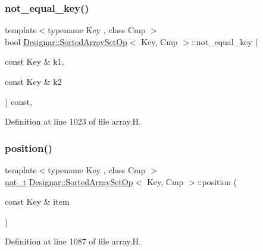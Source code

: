 \subsubsection{\texorpdfstring{not\+\_\+equal\+\_\+key()}{not\_equal\_key()}}
{\footnotesize\ttfamily template$<$typename Key , class Cmp $>$ \\
bool \hyperlink{class_designar_1_1_sorted_array_set_op}{Designar\+::\+Sorted\+Array\+Set\+Op}$<$ Key, Cmp $>$\+::not\+\_\+equal\+\_\+key (\begin{DoxyParamCaption}\item[{const Key \&}]{k1,  }\item[{const Key \&}]{k2 }\end{DoxyParamCaption}) const\hspace{0.3cm}{\ttfamily [inline]}, {\ttfamily [protected]}}



Definition at line 1023 of file array.\+H.

\mbox{\label{class_designar_1_1_sorted_array_set_op_a138b326d0002cf3ddc19a980b1ca9542}} 
\subsubsection{\texorpdfstring{position()}{position()}}
{\footnotesize\ttfamily template$<$typename Key , class Cmp $>$ \\
\hyperlink{namespace_designar_aa72662848b9f4815e7bf31a7cf3e33d1}{nat\+\_\+t} \hyperlink{class_designar_1_1_sorted_array_set_op}{Designar\+::\+Sorted\+Array\+Set\+Op}$<$ Key, Cmp $>$\+::position (\begin{DoxyParamCaption}\item[{const Key \&}]{item }\end{DoxyParamCaption})\hspace{0.3cm}{\ttfamily [inline]}}



Definition at line 1087 of file array.\+H.

\mbox{\label{class_designar_1_1_sorted_array_set_op_aa0ea019290a9b4a4777b5beb4c4d0c7d}} 
